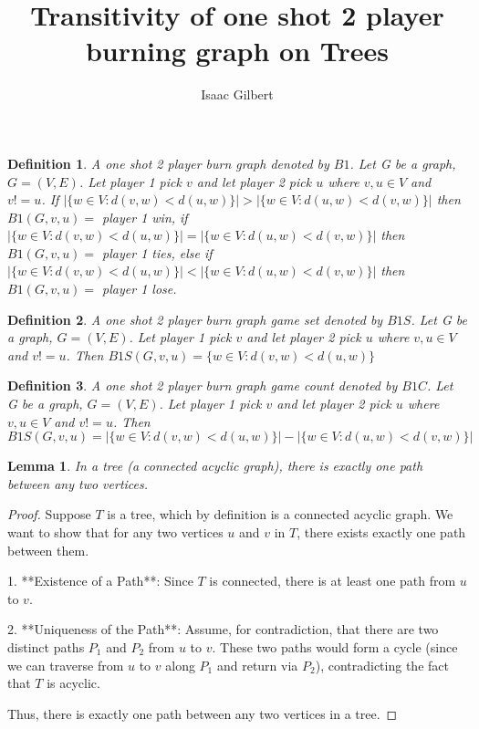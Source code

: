 \documentclass{article}
\newtheorem{lemma}{Lemma}
\newtheorem{definition}{Definition}
\begin{document}
\title{Transitivity of one shot 2 player burning graph on Trees}
\author{Isaac Gilbert}
\date{} %
\maketitle

\begin{definition}
A one shot 2 player burn graph denoted by \(B1\). Let G be a graph, \(G=(V,E)\). Let player 1 pick \(v\) and let player 2 pick \(u\) where \( v,u \in V \) and \( v ! = u \). If \(|\{ w \in V : d(v, w) < d(u, w) \}| > |\{ w \in V : d(u, w) < d(v, w) \}|\) then \(B1(G,v,u) =\) player 1 win, if \(|\{ w \in V : d(v, w) < d(u, w) \}| = |\{ w \in V : d(u, w) < d(v, w) \}|\) then \(B1(G,v,u) =\) player 1 ties, else if \(|\{ w \in V : d(v, w) < d(u, w) \}| < |\{ w \in V : d(u, w) < d(v, w) \}|\) then \(B1(G,v,u) =\) player 1 lose.
\end{definition}

\begin{definition}
A one shot 2 player burn graph game set denoted by \(B1S\). Let G be a graph, \(G=(V,E)\). Let player 1 pick \(v\) and let player 2 pick \(u\) where \( v,u \in V \) and \( v ! = u \). Then \(B1S(G,v,u) = \{ w \in V : d(v, w) < d(u, w) \}\)
\end{definition}

\begin{definition}
A one shot 2 player burn graph game count denoted by \(B1C\). Let G be a graph, \(G=(V,E)\). Let player 1 pick \(v\) and let player 2 pick \(u\) where \( v,u \in V \) and \( v ! = u \). Then \(B1S(G,v,u) = |\{ w \in V : d(v, w) < d(u, w) \}| - |\{ w \in V : d(u, w) < d(v, w) \}|\)
\end{definition}




\begin{lemma}
In a tree (a connected acyclic graph), there is exactly one path between any two vertices.
\end{lemma}

\begin{proof}
Suppose \( T \) is a tree, which by definition is a connected acyclic graph. We want to show that for any two vertices \( u \) and \( v \) in \( T \), there exists exactly one path between them.

1. **Existence of a Path**: Since \( T \) is connected, there is at least one path from \( u \) to \( v \).
   
2. **Uniqueness of the Path**: Assume, for contradiction, that there are two distinct paths \( P_1 \) and \( P_2 \) from \( u \) to \( v \). These two paths would form a cycle (since we can traverse from \( u \) to \( v \) along \( P_1 \) and return via \( P_2 \)), contradicting the fact that \( T \) is acyclic.

Thus, there is exactly one path between any two vertices in a tree.
\end{proof}
\end{document}
